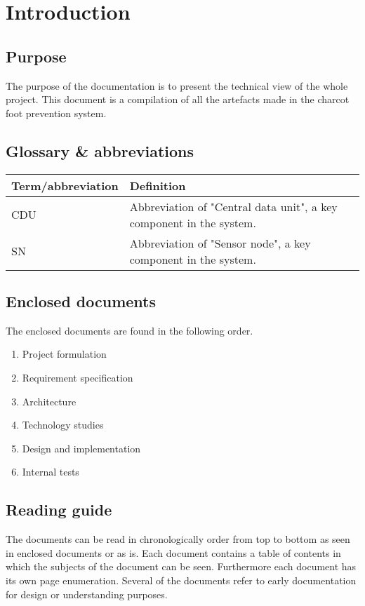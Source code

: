 \chapter{Introduction}
\section{Purpose}
The purpose of the documentation is to present the technical view of the whole project. This document is a compilation of all the artefacts made in the charcot foot prevention system. 

\section{Glossary \& abbreviations}
\begin{table}[H]
\centering
\begin{tabular}{|p{4cm}|p{7cm}|}
\hline
Term/abbreviation & Definition\\ \hline
CDU & Abbreviation of "Central data unit", a key component in the system.\\ \hline
SN & Abbreviation of "Sensor node", a key component in the system.\\ \hline
\end{tabular}
\end{table}

\section{Enclosed documents}
The enclosed documents are found in the following order.
\begin{enumerate}
\item Project formulation
\item Requirement specification
\item Architecture
\item Technology studies
\item Design and implementation
\item Internal tests
\end{enumerate}

\section{Reading guide}
The documents can be read in chronologically order from top to bottom as seen in enclosed documents or as is. Each document contains a table of contents in which the subjects of the document can be seen. Furthermore each document has its own page enumeration. Several of the documents refer to early documentation for design or understanding purposes. 